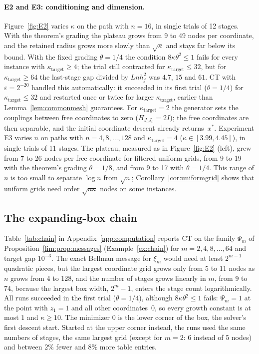 \paragraph{E2 and E3: conditioning and dimension.} Figure~\ref{fig:E2} varies
$\kappa$ on the path with $n=16$, in single trials of 12 stages. With the
theorem's grading the plateau grows from 9 to 49 nodes per coordinate, and the
retained radius grows more slowly than $\sqrt\kappa$ and stays far below its
bound. With the fixed grading $\theta=1/4$ the condition
$8\kappa\theta^2\le1$ fails for every instance with
$\kappa_{\mathrm{target}}\ge4$; the trial still contracted for
$\kappa_{\mathrm{target}}\le32$, but for $\kappa_{\mathrm{target}}\ge64$ the
last-stage gap divided by $Lnh_j^2$ was $4.7$, $15$ and $61$. CT with
$\varepsilon=2^{-20}$ handled this automatically: it succeeded in its first
trial ($\theta=1/4$) for $\kappa_{\mathrm{target}}\le32$ and restarted once or
twice for larger $\kappa_{\mathrm{target}}$, earlier than
Lemma~\ref{lem:commonmesh} guarantees. For $\kappa_{\mathrm{target}}=2$ the
generator sets the couplings between free coordinates to zero
($H_{J_0J_0}=2I$); the free coordinates are then separable, and the initial
coordinate descent already returns~$x^*$. Experiment E3 varies $n$ on paths
with $n=4,8,\dots,128$ and $\kappa_{\mathrm{target}}=4$ ($\kappa\in[3.99,4.45]$),
in single trials of 11 stages. The plateau, measured as in
Figure~\ref{fig:E2} (left), grew from 7 to 26 nodes per free coordinate for filtered uniform grids, from 9
to 19 with the theorem's grading $\theta=1/8$, and from 9 to 17 with
$\theta=1/4$. This range of $n$ is too small to separate $\log n$ from
$\sqrt n$; Corollary~\ref{cor:uniformgrid} shows that uniform grids need order
$\sqrt{n\kappa}$ nodes on some instances.

\subsection{The expanding-box chain}\label{sec:comp-chain}
Table~\ref{tab:chain} in Appendix~\ref{app:computation} reports CT on the
family $\Psi_m$ of Proposition~\ref{lim:prop:messages}
(Example~\ref{ex:chain}) for $m=2,4,8,\dots,64$ and target gap $10^{-3}$.
The exact Bellman message for $\xi_m$ would need at least $2^{m-1}$
quadratic pieces, but the largest coordinate grid grows only from 5 to 11
nodes as $n$ grows from 4 to 128, and the number of stages grows linearly in
$m$, from 9 to 74, because the largest box width, $2^m-1$, enters the stage
count logarithmically. All runs succeeded in the first trial ($\theta=1/4$),
although $8\kappa\theta^2\le1$ fails: $\Psi_m=1$ at the point with $z_1=1$ and
all other coordinates~$0$, so every growth constant is at most $1$ and
$\kappa\ge10$. The minimizer $0$ is the lower corner of the box, the solver's
first descent start. Started at the upper corner instead, the runs used the
same numbers of stages, the same largest grid (except for $m=2$: 6 instead of
5 nodes) and between $2\%$ fewer and $8\%$ more table entries.

